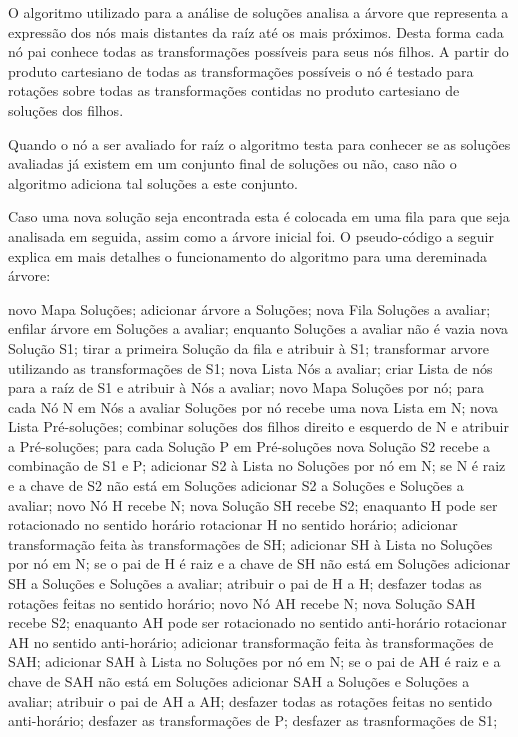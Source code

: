	O algoritmo utilizado para a análise de soluções analisa a árvore que representa a expressão dos nós mais distantes da raíz até os mais próximos. Desta forma cada nó pai conhece todas as transformações possíveis para seus nós filhos. A partir do produto cartesiano de todas as transformações possíveis o nó é testado para rotações sobre todas as transformações contidas no produto cartesiano de soluções dos filhos.
	
	Quando o nó a ser avaliado for raíz o algoritmo testa para conhecer se as soluções avaliadas já existem em um conjunto final de soluções ou não, caso não o algoritmo adiciona tal soluções a este conjunto.
	
	Caso uma nova solução seja encontrada esta é colocada em uma fila para que seja analisada em seguida, assim como a árvore inicial foi. O pseudo-código a seguir explica em mais detalhes o funcionamento do algoritmo para uma dereminada árvore:
	
novo Mapa Soluções;
adicionar árvore a Soluções;
nova Fila Soluções a avaliar;
enfilar árvore em Soluções a avaliar;
enquanto Soluções a avaliar não é vazia {
	nova Solução S1;
	tirar a primeira Solução da fila e atribuir à S1;
	transformar arvore utilizando as transformações de S1;
	nova Lista Nós a avaliar;
	criar Lista de nós para a raíz de S1 e atribuir à Nós a avaliar;
	novo Mapa Soluções por nó;
	para cada Nó N em Nós a avaliar {
		Soluções por nó recebe uma nova Lista em N;
		nova Lista Pré-soluções;
		combinar soluções dos filhos direito e esquerdo de N
			e atribuir a Pré-soluções;
		para cada Solução P em Pré-soluções {
			nova Solução S2 recebe a combinação de S1 e P;
			adicionar S2 à Lista no Soluções por nó em N;
			se N é raiz e a chave de S2 não está em Soluções {
				adicionar S2 a Soluções e Soluções a avaliar;
			}
			novo Nó H recebe N;
			nova Solução SH recebe S2;
			enaquanto H pode ser rotacionado no sentido horário {
				rotacionar H no sentido horário;
				adicionar transformação feita às transformações de SH;
				adicionar SH à Lista no Soluções por nó em N;
				se o pai de H é raiz e a chave de SH não está em Soluções {
					adicionar SH a Soluções e Soluções a avaliar;
				}
				atribuir o pai de H a H;
			}
			desfazer todas as rotações feitas no sentido horário;
			novo Nó AH recebe N;
			nova Solução SAH recebe S2;
			enaquanto AH pode ser rotacionado no sentido anti-horário {
				rotacionar AH no sentido anti-horário;
				adicionar transformação feita às transformações de SAH;
				adicionar SAH à Lista no Soluções por nó em N;
				se o pai de AH é raiz e a chave de SAH não está em Soluções {
					adicionar SAH a Soluções e Soluções a avaliar;
				}
				atribuir o pai de AH a AH;
			}
			desfazer todas as rotações feitas no sentido anti-horário;
			desfazer as transformações de P;
		}
	}
	desfazer as trasnformações de S1;
}	

